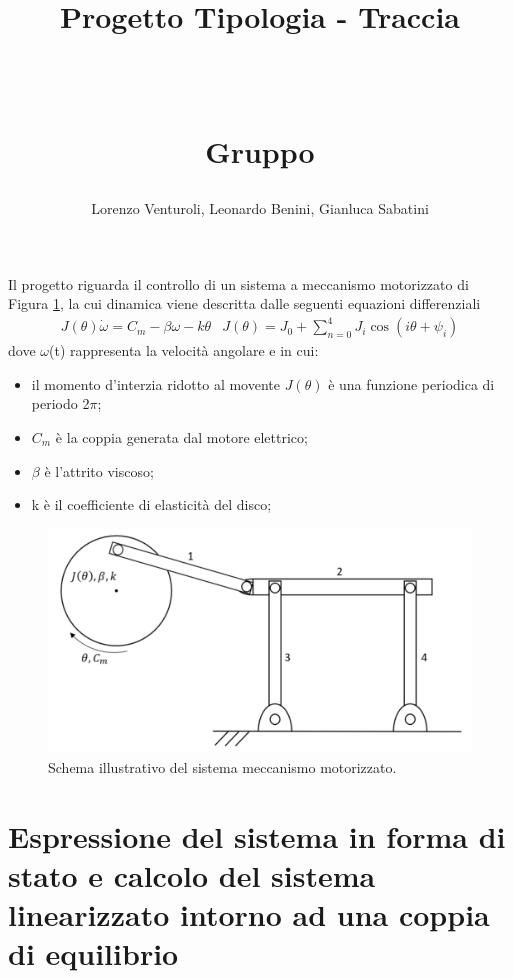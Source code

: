 \documentclass[a4paper, 11pt]{article}
\title{ \vspace{-1in}
		\huge \strut \coursename \strut 
		\\
		\Large  \strut Progetto Tipologia \tipology - Traccia \trace 
		\\
		\Large  \strut \projectname\strut
		\\
		\Large  \strut Gruppo \group\strut
		\vspace{-0.4cm}
}
\author{Lorenzo Venturoli, Leonardo Benini, Gianluca Sabatini}
\date{}
\begin{document}
\maketitle
\vspace{-0.5cm}

Il progetto riguarda il controllo di un sistema a meccanismo motorizzato di Figura \ref{fig:system_image}, la cui dinamica viene descritta dalle seguenti equazioni differenziali  
%
\begin{subequations}\label{eq:system}
	\begin{align}
		J(\theta)\dot{\omega} = C_m - \beta\omega - k\theta 
	\end{align}
	\begin{align}
		J(\theta) = J_0 + \sum_{n = 0}^{4}J_i\cos (i\theta +\psi_i)
	\end{align}
\end{subequations}
%
dove $\omega$(t) rappresenta la velocità angolare e in cui:
\begin{itemize}
	\item il momento d'interzia ridotto al movente $J(\theta)$ è una funzione periodica di periodo 2$\pi$;
	\item $C_m$ è la coppia generata dal motore elettrico;
	\item $\beta$ è l'attrito viscoso;
	\item k è il coefficiente di elasticità del disco;
\end{itemize}
%
\begin{figure}[h!]
	\centering
	\includegraphics[width=0.75\linewidth]{./images/system_image.png}
	\caption{Schema illustrativo del sistema meccanismo motorizzato.}
	\label{fig:system_image}
\end{figure}
\section{Espressione del sistema in forma di stato e calcolo del sistema linearizzato intorno ad una coppia di equilibrio}
\end{document}
